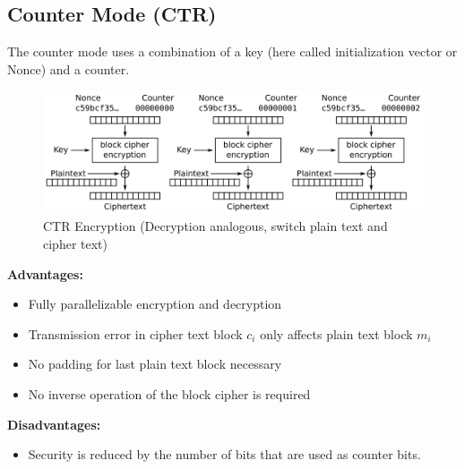 \subsection{Counter Mode (CTR)}

The counter mode uses a combination of a key (here called initialization vector or Nonce) and a counter.

\begin{figure}[h]
    \center
    \includegraphics[width=\linewidth]{gfx/enc_ctr.png}
    \caption{CTR Encryption (Decryption analogous, switch plain text and cipher text)}
    \label{fig:ctr_enc}
\end{figure}

\textbf{Advantages:}

\begin{itemize}
    \item Fully parallelizable encryption and decryption
    \item Transmission error in cipher text block $c_i$ only affects plain text block $m_i$
    \item No padding for last plain text block necessary
    \item No inverse operation of the block cipher is required
\end{itemize}

\textbf{Disadvantages:}

\begin{itemize}
    \item Security is reduced by the number of bits that are used as counter bits.
\end{itemize}
